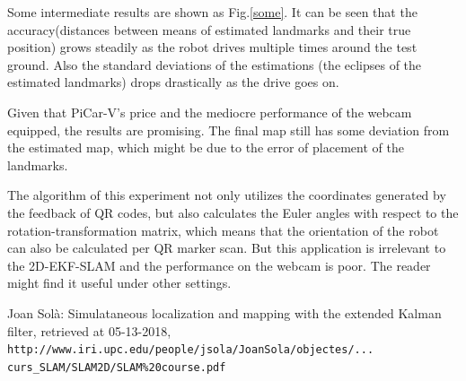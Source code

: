\documentclass[12pt]{article}
\begin{document}
Some intermediate results are shown as Fig.{\ref{some}}. It can be seen that the accuracy(distances between means of estimated landmarks and their true position) grows steadily as the robot drives multiple times around the test ground. Also the standard deviations of the estimations (the eclipses of the estimated landmarks) drops drastically as the drive goes on.





Given that PiCar-V's price and the mediocre performance of the webcam equipped, the results are promising. The final map still has some deviation from the estimated map, which might be due to the error of placement of the landmarks. 

The algorithm of this experiment not only utilizes the coordinates generated by the feedback of QR codes, but also calculates the Euler angles with respect to the rotation-transformation matrix, which means that the orientation of the robot can also be calculated per QR marker scan. But this application is irrelevant to the 2D-EKF-SLAM and the performance on the webcam is poor. The reader might find it useful under other settings.
 

\clearpage
\begin{thebibliography}{9}

Joan Sol\`a: Simulataneous localization and mapping
with the extended Kalman filter, retrieved at 05-13-2018,
\\\texttt{http://www.iri.upc.edu/people/jsola/JoanSola/objectes/...\\curs\_SLAM/SLAM2D/SLAM\%20course.pdf}
\end{thebibliography}


 
\end{document}

